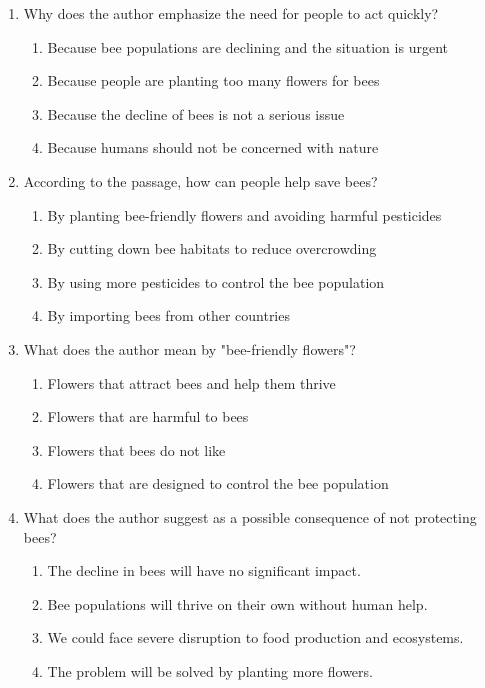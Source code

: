 \documentclass[12pt]{article}
\begin{document}
\begin{enumerate}
    \vspace{0.5cm}

    \item Why does the author emphasize the need for people to act quickly?
    \begin{enumerate}[label=\Alph*.]
        \item Because bee populations are declining and the situation is urgent
        \item Because people are planting too many flowers for bees
        \item Because the decline of bees is not a serious issue
        \item Because humans should not be concerned with nature
    \end{enumerate}

    \vspace{0.5cm}

    \item According to the passage, how can people help save bees?
    \begin{enumerate}[label=\Alph*.]
        \item By planting bee-friendly flowers and avoiding harmful pesticides
        \item By cutting down bee habitats to reduce overcrowding
        \item By using more pesticides to control the bee population
        \item By importing bees from other countries
    \end{enumerate}

    \vspace{0.5cm}

    \item What does the author mean by "bee-friendly flowers"?
    \begin{enumerate}[label=\Alph*.]
        \item Flowers that attract bees and help them thrive
        \item Flowers that are harmful to bees
        \item Flowers that bees do not like
        \item Flowers that are designed to control the bee population
    \end{enumerate}

    \vspace{0.5cm}

    \item What does the author suggest as a possible consequence of not protecting bees?
    \begin{enumerate}[label=\Alph*.]
        \item The decline in bees will have no significant impact.
        \item Bee populations will thrive on their own without human help.
        \item We could face severe disruption to food production and ecosystems.
        \item The problem will be solved by planting more flowers.
    \end{enumerate}


\end{enumerate}
\end{document}

